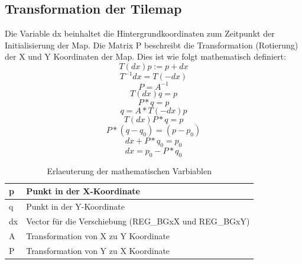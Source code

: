 \subsection{Transformation der Tilemap}
Die Variable dx beinhaltet die Hintergrundkoordinaten zum Zeitpunkt der Initialisierung der Map.
Die Matrix P beschreibt die Transformation (Rotierung) der X und Y Koordinaten der Map. Dies ist wie folgt mathematisch definiert:
\begin{equation}
T(dx)p := p + dx
\end{equation}
\begin{equation}
T^{-1}dx = T(-dx)
\end{equation}
\begin{equation}
P = A^{-1}
\end{equation}
\begin{equation}
T(dx)q = p
\end{equation}
\begin{equation}
P * q = p
\end{equation}
\begin{equation}
q = A * T(-dx)p
\end{equation}
\begin{equation}
T(dx)P * q = p
\end{equation}
\begin{equation}
P * (q-q_{0}) = (p-p_{0})
\end{equation}
\begin{equation}
dx + P * q_{0} = p_{0}
\end{equation}
\begin{equation}
dx = p_{0} - P * q_{0}
\end{equation}
\begin{table}[h]
\centering
\begin{tabular}{|l|l|}
\hline
p  & Punkt in der X-Koordinate                             \\ \hline
q  & Punkt in der Y-Koordinate                             \\ \hline
dx & Vector für die Verschiebung (REG\_BGxX und REG\_BGxY) \\ \hline
A  & Transformation von X zu Y Koordinate                  \\ \hline
P  & Transformation von Y zu X Koordinate                  \\ \hline
\end{tabular}
\caption{Erlaeuterung der mathematischen Varbiablen}
\label{mathavar}
\end{table}

